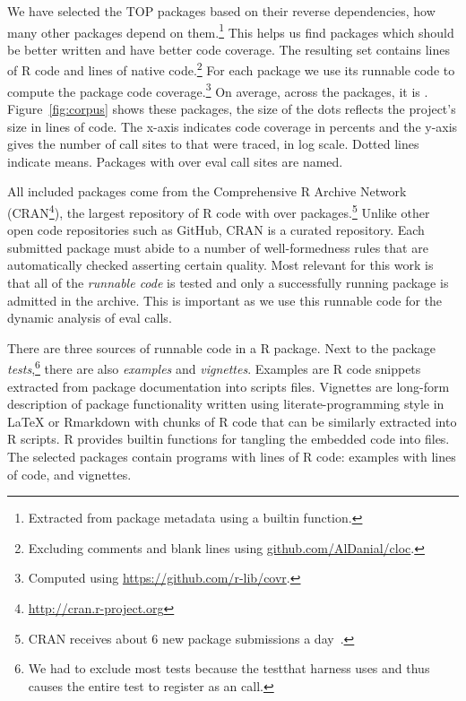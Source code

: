 \documentclass[USenglish,cleveref, autoref, thm-restate]{lipics-v2019}
\begin{document}
We have selected the TOP \CorpusPackages packages based on their reverse
dependencies, \ie how many other packages depend on them.\footnote{Extracted
  from package metadata using a builtin function.}  This helps us find
packages which should be better written and have better code coverage.  The
resulting set contains \CorpusRCodeRnd lines of R code and
\CorpusNativeCodeRnd lines of native code.\footnote{Excluding comments and
  blank lines using \url{github.com/AlDanial/cloc}.}  For each package we
use its runnable code to compute the package code coverage.\footnote{Computed
  using \url{ https://github.com/r-lib/covr}.} On average, across the
\CorpusPackages packages, it is \CorpusMeanExprCoverage.
Figure~\ref{fig:corpus} shows these packages, the size of the dots reflects
the project's size in lines of code.  The x-axis indicates code coverage in
percents and the y-axis gives the number of call sites to \eval that were traced, in log
scale. Dotted lines indicate means. Packages with over
\CorpusEvalsPackageTreshold eval call sites are named.

All included packages come from the Comprehensive R Archive Network
(CRAN\footnote{\url{http://cran.r-project.org}}), the largest repository of R
code with over \CorpusAllCranRnd packages.\footnote{CRAN receives about 6 new
  package submissions a day~\cite{Ligges2017}.} Unlike other open code
repositories such as GitHub, CRAN is a curated repository. Each submitted
package must abide to a number of well-formedness rules that are automatically
checked asserting certain quality. Most relevant for this work is that all of
the \emph{runnable code} is tested and only a successfully running package is
admitted in the archive. This is important as we use this runnable code for the
dynamic analysis of eval calls.

There are three sources of runnable code in a R package. Next to the package
\emph{tests},\footnote{We had to exclude most tests because the {testthat}
  harness uses \eval and thus causes the entire test to register as an \eval
  call.} there are also \emph{examples} and \emph{vignettes}. Examples are R
code snippets extracted from package documentation into scripts files.
Vignettes are long-form description of package functionality written using
literate-programming style in \LaTeX\xspace or Rmarkdown with chunks of R
code that can be similarly extracted into R scripts. R provides builtin
functions for tangling the embedded code into files.  The selected packages
contain \CorpusPackagePrograms programs with \CorpusPackageProgramsCodeRnd
lines of R code: \CorpusExamplesProgramsRnd examples with
\CorpusExamplesCodeRnd lines of code, and \CorpusVignettesProgramsRnd
vignettes.
\end{document}
